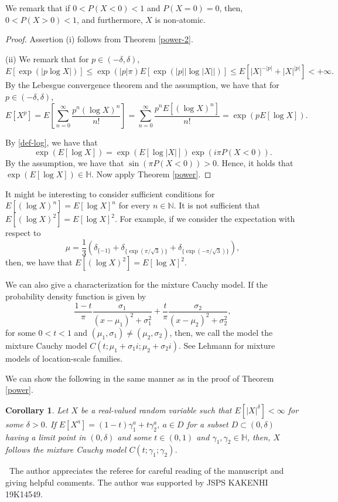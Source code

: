 \documentclass[a4paper, reqno, 11pt]{amsart}
\newtheorem{Cor}[Thm]{Corollary}
\theoremstyle{definition}
\begin{document}
We remark that if $0 < P(X < 0) < 1$ and $P(X = 0) = 0$, then, $0 < P(X > 0) < 1$, and furthermore, $X$ is non-atomic. %

\begin{proof}
Assertion (i) follows from Theorem \ref{power-2}. 

(ii) We remark that for $p \in (-\delta, \delta)$, 
\[ E[\exp(|p \log X|)] \le \exp(|p| \pi) E[\exp(|p| |\log |X||)] \le E\left[|X|^{-|p|} + |X|^{|p|}\right] < +\infty. \]
By the Lebesgue convergence theorem and the assumption, we have that for $p \in (-\delta, \delta)$, 
\[ E[X^p] = E\left[ \sum_{n=0}^{\infty} \frac{p^n (\log X)^n}{n!}\right] = \sum_{n=0}^{\infty} \frac{p^n E\left[ (\log X)^n\right]}{n!}  = \exp(p E[\log X]). \]

By \eqref{def-log}, we have that 
\[ \exp(E[\log X]) = \exp(E[\log |X|]) \exp(i \pi P(X < 0)).  \]
By the assumption, we have that $\sin(\pi P(X < 0)) > 0$. 
Hence, it holds that  $\exp(E[\log X]) \in \mathbb{H}$. 
Now apply Theorem \ref{power}. 
\end{proof}

It might be  interesting to consider sufficient conditions for $E[(\log X)^n] = E[\log X]^n$ for every $n \in \mathbb{N}$.  
It is not sufficient that $E[(\log X)^2] = E[\log X]^2$. 
For example, if we consider the expectation with respect to 
$$\mu = \frac{1}{3} \left( \delta_{\{-1\}} + \delta_{\{\exp(\pi/\sqrt{3})\}} + \delta_{\{\exp(-\pi/\sqrt{3})\}}  \right),$$ 
then, we have that $E[(\log X)^2] = E[\log X]^2$. 


We can also give a characterization for the mixture Cauchy model. 
If the probability density function is given by 
\[ \frac{1-t}{\pi} \frac{\sigma_1}{(x-\mu_1)^2 + \sigma_1^2} + \frac{t}{\pi} \frac{\sigma_2}{(x-\mu_2)^2 + \sigma_2^2}, \]
for some $0 < t < 1$ and $(\mu_1, \sigma_1) \ne (\mu_2, \sigma_2)$, 
then, we call the model the mixture Cauchy model $C\left(t; \mu_1 + \sigma_1 i;  \mu_2 + \sigma_2 i\right)$. 
See Lehmann \cite[pp.480-481]{Lehmann1999} for mixture models of location-scale families. 

We can show the following in the same manner as in the proof of Theorem \ref{power}. 
\begin{Cor}
Let $X$ be a real-valued random variable such that $E\left[|X|^{\delta}\right] < \infty$  for some $\delta > 0$. 
If $E[X^a] = (1-t) \gamma_1^a + t \gamma_2^a, \  a \in D$ for  a subset $D \subset (0, \delta)$ having a limit point in $(0, \delta)$ and some $t \in (0,1)$ and $\gamma_1, \gamma_2 \in \mathbb{H}$, 
then, $X$ follows the mixture Cauchy model $C(t; \gamma_1; \gamma_2)$. 
\end{Cor}

 \ The author appreciates the referee for careful reading of the manuscript and giving helpful comments. 
The author was supported by JSPS KAKENHI  19K14549. 





\end{document}
